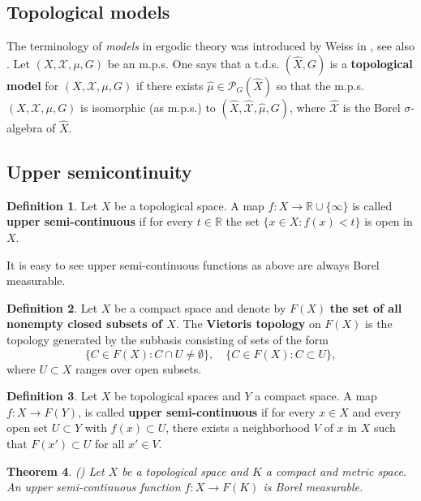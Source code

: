 \documentclass[11pt]{article}
\theoremstyle{plain}
\newtheorem{thm}{Theorem}[section]
\theoremstyle{definition}
\newtheorem{defn}[thm]{Definition}
\def\R{\mathbb{R}}
\numberwithin{figure}{section}
\begin{document}
\subsection{Topological models}
The terminology of \textit{models} in ergodic theory was introduced by Weiss in \cite{w85}, see also \cite[Chapters 2 \& 15]{G03}.
Let $(X,\mathcal{X},\mu,G)$ be an m.p.s. One says that a t.d.s. $(\hat{X},G)$
is a \textbf{topological model} for $(X,\mathcal{X},\mu,G)$  if there exists  $\hat{\mu}\in \mathcal{P}_{G}(\hat{X})$ so that the m.p.s.\
$(X,\mathcal{X},\mu,G)$ is isomorphic (as m.p.s.) to $(\hat{X},\hat{\mathcal{X}},\hat{\mu},G)$, where $\hat{\mathcal{X}}$ is the Borel $\sigma$-algebra of $\hat{X}$. 

\subsection{Upper semicontinuity}\label{subsec:usc}

\begin{defn}
   Let $X$ be a topological space. A map $f:X\to\R\cup\{\infty\}$ is called  \textbf{upper semi-continuous}  if for every $t\in\R$ the set $\{x\in X: f(x)<t\}$ is open in $X$. 
\end{defn}
It is easy to see upper semi-continuous functions as above are always Borel measurable.

\begin{defn}
 Let $X$ be a compact space and denote by $F(X)$ \textbf{the set of all nonempty closed subsets of $X$}. The \textbf{Vietoris topology} on $F(X)$ is the topology generated by the subbasis consisting of sets of the form
\[
\{C\in F(X): C\cap U\neq \emptyset\},\quad 
\{C\in F(X): C\subset U\},
\]
where $U\subset X$ ranges over open subsets.    
\end{defn}
\begin{defn}
    
Let $X$ be topological spaces and $Y$ a compact space. A  map $f:X\to F(Y)$, is called \textbf{upper semi-continuous} if for every $x\in X$ and every open set $U\subset Y$ with $f(x)\subset U$, there exists a neighborhood $V$ of $x$ in $X$ such that $F(x')\subset U$ for all $x'\in V$.
\end{defn}

\begin{thm}\label{thm:usc_implies_Borel}(\cite[Theorem III.9]{CastaingValadier1977})
    Let $X$ be a topological space and $K$ a compact and metric space. An upper semi-continuous function $f:X\to F(K)$ is Borel measurable.  
\end{thm}
\end{document}
